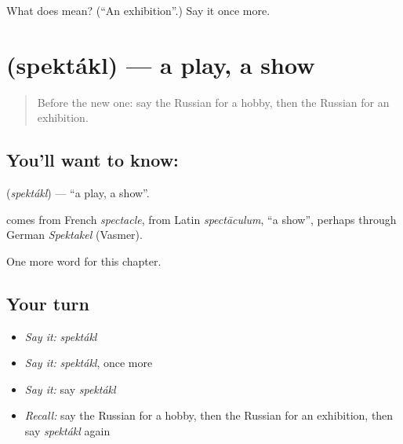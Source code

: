 \begin{tcolorbox}[breakable,colback=teal!4,colframe=teal!35!black,title={Before you move on}]
What does  mean? (\textquotedblleft{}An exhibition\textquotedblright{}.) Say it once more.
\end{tcolorbox}
\section[\texorpdfstring{\ru{спектакль} (spektákl)}{спектакль (spektákl)}]{ (spektákl) — a play, a show}

\label{lesson:RU-C197-spektakl}



\begin{quote}
Before the new one: say the Russian for a hobby, then the Russian for an exhibition.
\end{quote}

\subsection*{You'll want to know: }
\textbf{} (\emph{spektákl}) — \textquotedblleft{}a play, a show\textquotedblright{}.

\begin{cousinweb}
\textbf{} comes from French \emph{spectacle}, from Latin \emph{spectāculum}, \textquotedblleft{}a show\textquotedblright{}, perhaps through German \emph{Spektakel} (Vasmer).
\end{cousinweb}

\begin{grammarlens}[title={What you've built}]
One more word for this chapter.
\end{grammarlens}

\subsection*{Your turn}
\begin{itemize}
\raggedright
  \item \emph{Say it:} \emph{spektákl}
  \item \emph{Say it:} \emph{spektákl}, once more
  \item \emph{Say it:} say \emph{spektákl}
  \item \emph{Recall:} say the Russian for a hobby, then the Russian for an exhibition, then say \emph{spektákl} again
\end{itemize}

